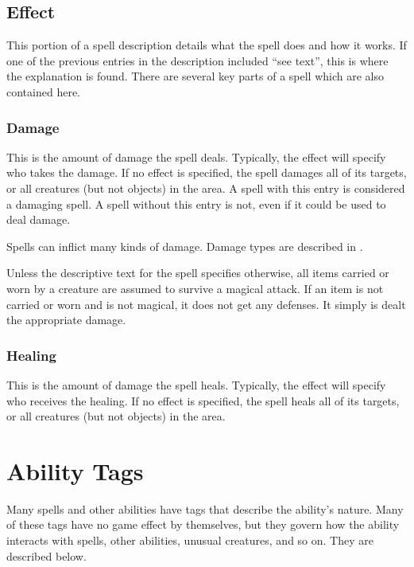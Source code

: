     \subsection{Effect}
        This portion of a spell description details what the spell does and how it works.
        If one of the previous entries in the description included ``see text'', this is where the explanation is found.
        There are several key parts of a spell which are also contained here.

        \subsubsection{Damage}
            This is the amount of damage the spell deals.
            Typically, the effect will specify who takes the damage.
            If no effect is specified, the spell damages all of its targets, or all creatures (but not objects) in the area.
            A spell with this entry is considered a damaging spell.
            A spell without this entry is not, even if it could be used to deal damage.

            Spells can inflict many kinds of damage.
            Damage types are described in .

             Unless the descriptive text for the spell specifies otherwise, all items carried or worn by a creature are assumed to survive a magical attack.
            If an item is not carried or worn and is not magical, it does not get any defenses.
            It simply is dealt the appropriate damage.

        \subsubsection{Healing}
            This is the amount of damage the spell heals.
            Typically, the effect will specify who receives the healing.
            If no effect is specified, the spell heals all of its targets, or all creatures (but not objects) in the area.

\section{Ability Tags}\label{Ability Tags}

    Many spells and other abilities have tags that describe the ability's nature.
    Many of these tags have no game effect by themselves, but they govern how the ability interacts with spells, other abilities, unusual creatures, and so on.
    They are described below.

